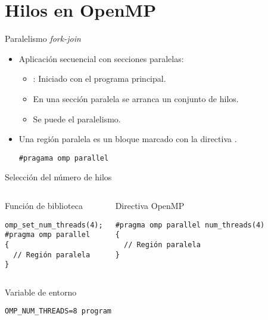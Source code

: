 \section{Hilos en OpenMP}

\begin{frame}[t,fragile]{Paralelismo \emph{fork-join}}
\begin{itemize}
  \item Aplicación secuencial con secciones paralelas:
    \begin{itemize}
      \item {}: Iniciado con el programa principal.
      \item En una sección paralela se arranca un conjunto de hilos.
      \item Se puede  el paralelismo.
    \end{itemize}

  \item Una región paralela es un bloque marcado con la directiva .
\begin{lstlisting}
#pragama omp parallel
\end{lstlisting}
\end{itemize}
\end{frame}

\begin{frame}[t,fragile]{Selección del número de hilos}
\begin{columns}[T]

\begin{block}{Función de biblioteca}
\begin{lstlisting}[basicstyle=\tiny]
omp_set_num_threads(4);
#pragma omp parallel
{
  // Región paralela
}
\end{lstlisting}
\end{block}

\begin{block}{Directiva OpenMP}
\begin{lstlisting}[basicstyle=\tiny]
#pragma omp parallel num_threads(4)
{
  // Región paralela
}
\end{lstlisting}
\end{block}
\end{columns}

\begin{columns}



\begin{block}{Variable de entorno}
\begin{lstlisting}[style=terminal,basicstyle=\tiny]
OMP_NUM_THREADS=8 program
\end{lstlisting}
\end{block}

\end{columns}

\end{frame}

